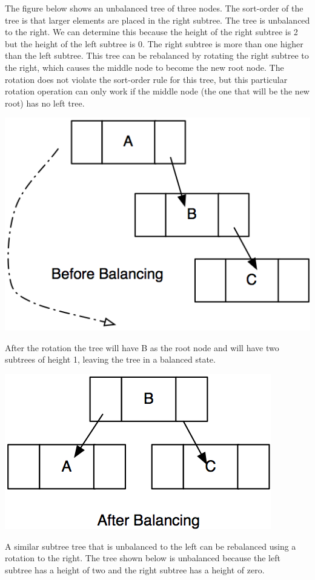 The figure below shows an unbalanced tree of three nodes. The sort-order of the tree is that larger elements are placed in the right subtree.  The tree is unbalanced to the
right.  We can determine this because the height of the right subtree is 2 but the height of the left subtree is 0.  The right subtree is more than one higher than the left subtree.    This tree can be rebalanced by rotating  the right subtree to the right, which causes the middle node to become the new root node.   The rotation does not violate the sort-order rule for this tree, but this particular
rotation operation can only work if the middle node (the one that will
be the new root) has no left tree.

\includegraphics{pictures/image7.png}

After the rotation the tree will have B as the root node and will have two subtrees of height 1, leaving the tree in a balanced state.

\includegraphics{pictures/image8.png}

A similar subtree tree that is unbalanced to the left can be rebalanced using a rotation to
the right.  The tree shown below is unbalanced because the left subtree has a height of two and the right subtree has a height of zero.  


